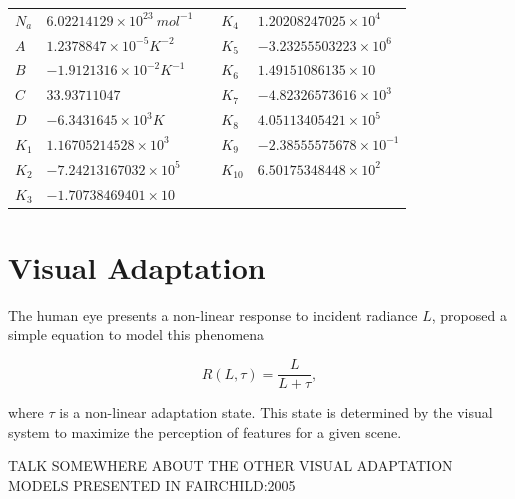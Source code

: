 \begin{table}[htbp!]
\begin{tabular}{|l|l|l|l|l|}
$N_a$ & $6.02214129 \times 10^{23}~mol^{-1}$ &  & $K_4$  & $1.20208247025 \times 10^{4}$   \\ \cline{1-2} \cline{4-5} 
$A$   & $1.2378847 \times 10^{-5} K^{-2}$    &  & $K_5$  & $-3.23255503223 \times 10^{6}$  \\ \cline{1-2} \cline{4-5} 
$B$   & $-1.9121316 \times 10^{-2} K^{-1}$   &  & $K_6$  & $1.49151086135 \times 10$       \\ \cline{1-2} \cline{4-5} 
$C$   & $33.93711047$                        &  & $K_7$  & $-4.82326573616 \times 10^{3}$  \\ \cline{1-2} \cline{4-5} 
$D$   & $-6.3431645 \times 10^3 K$           &  & $K_8$  & $4.05113405421 \times 10^{5}$   \\ \cline{1-2} \cline{4-5} 
$K_1$ & $1.16705214528 \times 10^{3}$        &  & $K_9$  & $-2.38555575678 \times 10^{-1}$ \\ \cline{1-2} \cline{4-5} 
$K_2$ & $-7.24213167032 \times 10^{5}$       &  & $K_{10}$ & $6.50175348448 \times 10^{2}$   \\ \cline{1-2} \cline{4-5} 
$K_3$ & $-1.70738469401 \times 10$           &  &        &                                 \\ \cline{1-2} \cline{4-5}
\end{tabular}
\end{table}

\section{Visual Adaptation}
\label{sec:visual_adaptation}

The human eye presents a non-linear response to incident radiance $L$, \cite{Naka:1966} proposed a simple equation to model this phenomena

\begin{equation}
\label{eq:visual_adaptation}
R(L, \tau) = \frac{L}{L + \tau},
\end{equation}

where $\tau$ is a non-linear adaptation state.
This state is determined by the visual system to maximize the perception of features for a given scene.

TALK SOMEWHERE ABOUT THE OTHER VISUAL ADAPTATION MODELS PRESENTED IN FAIRCHILD:2005

